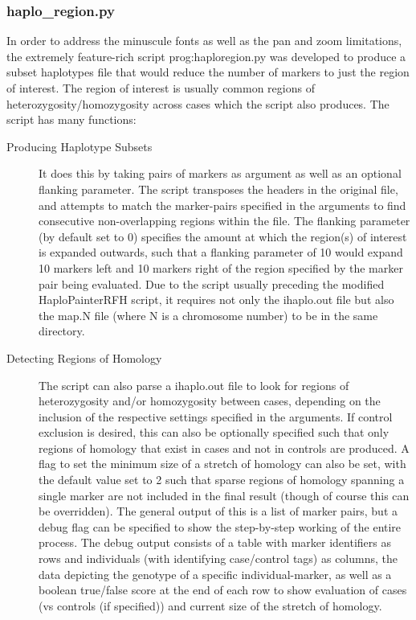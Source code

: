\subsubsection{haplo\_region.py}

In order to address the minuscule fonts as well as the pan and zoom limitations, the extremely feature-rich script \gls{prog:haploregion.py} was developed to produce a subset haplotypes file that would reduce the number of markers to just the region of interest. The region of interest is usually common regions of heterozygosity/homozygosity across cases which the script also produces. The script has many functions:

\begin{description}
\item[Producing Haplotype Subsets]{It does this by taking pairs of markers as argument as well as an optional flanking parameter. The script transposes the headers in the original file, and attempts to match the marker-pairs specified in the arguments to find consecutive non-overlapping regions within the file. The flanking parameter (by default set to 0) specifies the amount at which the region(s) of interest is expanded outwards, such that a flanking parameter of 10 would expand 10 markers left and 10 markers right of the region specified by the marker pair being evaluated. Due to the script usually preceding the modified HaploPainterRFH script, it requires not only the ihaplo.out file but also the map.N file (where N is a chromosome number) to be in the same directory.}

\item[Detecting Regions of Homology]{The script can also parse a ihaplo.out file to look for regions of heterozygosity and/or homozygosity between cases, depending on the inclusion of the respective settings specified in the arguments. If control exclusion is desired, this can also be optionally specified such that only regions of homology that exist in cases and not in controls are produced. A flag to set the minimum size of a stretch of homology can also be set, with the default value set to 2 such that sparse regions of homology spanning a single marker are not included in the final result (though of course this can be overridden). The general output of this is a list of marker pairs, but a debug flag can be specified to show the step-by-step working of the entire process. The debug output consists of a table with marker identifiers as rows and individuals (with identifying case/control tags) as columns, the data depicting the genotype of a specific individual-marker, as well as a boolean true/false score at the end of each row to show evaluation of cases (vs controls (if specified)) and current size of the stretch of homology.}


\end{description}
